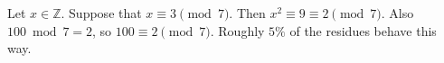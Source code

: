 Let $x \in \mathbb{Z}$.
Suppose that $x \equiv 3 \pmod{7}$.
Then $x^{2} \equiv 9 \equiv 2 \pmod{7}$.
Also $100 \bmod 7 = 2$, so $100 \equiv 2 \pmod{7}$.
Roughly $5\%$ of the residues behave this way.